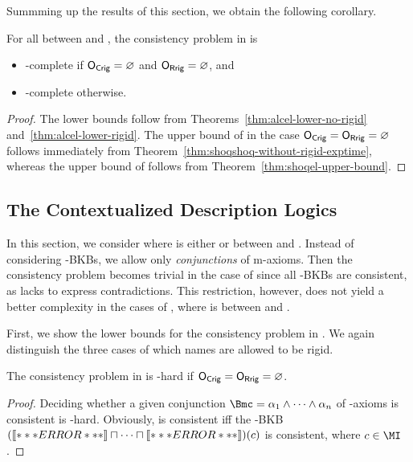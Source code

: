 Summming up the results of this section, we obtain the following corollary.

\begin{corollary}
  For all \LM between \ALC and \SHOQ, the consistency problem in \LMEL is
    \begin{itemize}
        \item \ExpTime-complete if $\OCR=\emptyset$ and $\ORR=\emptyset$, and
        \item \NExpTime-complete otherwise.
    \end{itemize}
\end{corollary}

\begin{proof}
  The lower bounds follow from Theorems~\ref{thm:alcel-lower-no-rigid}
  and~\ref{thm:alcel-lower-rigid}.  The upper bound of \ExpTime in the case $\OCR=\ORR=\emptyset$
  follows immediately from Theorem~\ref{thm:shoqshoq-without-rigid-exptime}, whereas the upper bound
  of \NExpTime follows from Theorem~\ref{thm:shoqel-upper-bound}.
\end{proof}

\subsection{The Contextualized Description Logics \texorpdfstring{\ELLO}{EL[LO]}}
\label{sec:dlouter-el}

In this section, we consider \ELLO where \LO is either \EL or between \ALC and \SHOQ.
%
Instead of considering \ELLO-BKBs, we allow only \emph{conjunctions} of m-axioms.   Then the consistency problem becomes trivial in the case of \ELEL since all
\ELEL-BKBs are consistent, as \EL lacks to express contradictions.
%
This restriction, however, does not yield a better complexity in the cases of \ELLO, where \LO is
between \ALC and \SHOQ.

First, we show the lower bounds for the consistency problem in \ELALC.  We again distinguish the
three cases of which names are allowed to be rigid.

\begin{theorem}\label{thm:el-lower-exp}
  The consistency problem in \ELALC is \ExpTime-hard if $\OCR = \ORR = \emptyset$.
\end{theorem}

\begin{proof}
  Deciding whether a given conjunction $\B = \alpha_{1} \land \dots \land \alpha_{n}$ of \ALC-axioms
  is consistent is \ExpTime-hard\cite{Sch-IJCAI91}.  Obviously, \B is consistent iff the \ELALC-BKB
  $(\oax{\alpha_{1}} \sqcap \dots \sqcap \oax{\alpha_{n}})(c)$ is consistent, where $c\in\MI$.
\end{proof}

